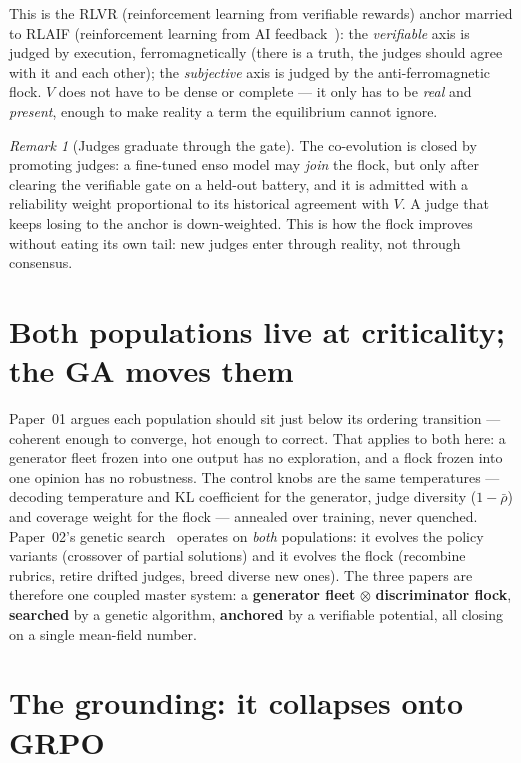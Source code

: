 \documentclass[11pt]{article}
\theoremstyle{definition}
\theoremstyle{remark}
\newtheorem{remark}{Remark}
\begin{document}
This is the RLVR (reinforcement learning from verifiable rewards) anchor married to RLAIF (reinforcement
learning from AI feedback~\cite{bai2022constitutional}): the \emph{verifiable} axis is judged by execution, ferromagnetically (there is
a truth, the judges should agree with it and each other); the \emph{subjective} axis is judged by the
anti-ferromagnetic flock. $V$ does not have to be dense or complete --- it only has to be \emph{real} and
\emph{present}, enough to make reality a term the equilibrium cannot ignore.

\begin{remark}[Judges graduate through the gate]
The co-evolution is closed by promoting judges: a fine-tuned enso model may \emph{join} the flock, but only
after clearing the verifiable gate on a held-out battery, and it is admitted with a reliability weight
proportional to its historical agreement with $V$. A judge that keeps losing to the anchor is down-weighted.
This is how the flock improves without eating its own tail: new judges enter through reality, not through
consensus.
\end{remark}

\section{Both populations live at criticality; the GA moves them}
\label{sec:crit}

Paper~01 argues each population should sit just below its ordering transition --- coherent enough to
converge, hot enough to correct. That applies to both here: a generator fleet frozen into one output has no
exploration, and a flock frozen into one opinion has no robustness. The control knobs are the same
temperatures --- decoding temperature and KL coefficient for the generator, judge diversity ($1-\bar\rho$)
and coverage weight for the flock --- annealed over training, never quenched. Paper~02's genetic
search~\cite{hanzo-evo} operates on \emph{both} populations: it evolves the policy variants (crossover of
partial solutions) and it evolves the flock (recombine rubrics, retire drifted judges, breed diverse new
ones). The three papers are therefore one coupled master system: a \textbf{generator fleet}
$\otimes$ \textbf{discriminator flock}, \textbf{searched} by a genetic algorithm, \textbf{anchored} by a
verifiable potential, all closing on a single mean-field number.

\section{The grounding: it collapses onto GRPO}
\label{sec:grounding}
\end{document}
